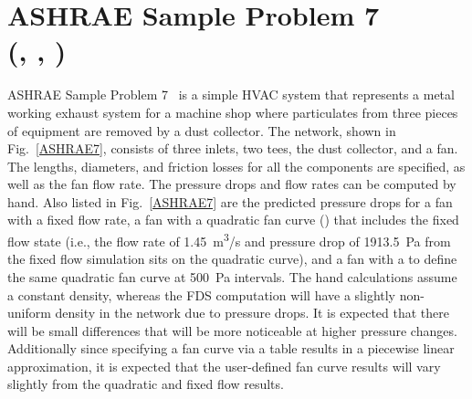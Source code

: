 \documentclass[11pt]{book}
\begin{document}
\FloatBarrier


\section{ASHRAE Sample Problem 7\\(\texorpdfstring{}{ashrae\_7\_fixed\_flow}, \texorpdfstring{}{ashrae\_7\_quadratic}, \texorpdfstring{}{ashrae\_7\_table})}
\label{ashrae7}
\label{ashrae7_fixed_flow}
\label{ashrae7_quadratic}
\label{ashrae7_table}

ASHRAE Sample Problem 7~\cite{ASHRAE} is a simple HVAC system that represents a metal working exhaust system for a machine shop where particulates from three pieces of equipment are removed by a dust collector.  The network, shown in Fig.~\ref{ASHRAE7}, consists of three inlets, two tees, the dust collector, and a fan.  The lengths, diameters, and friction losses for all the components are specified, as well as the fan flow rate. The pressure drops and flow rates can be computed by hand.  Also listed in Fig.~\ref{ASHRAE7} are the predicted pressure drops for a fan with a fixed flow rate, a fan with a quadratic fan curve () that includes the fixed flow state (i.e., the flow rate of 1.45~\si{m^3/s} and pressure drop of 1913.5~Pa from the fixed flow simulation sits on the quadratic curve), and a fan with a  to define the same quadratic fan curve at 500~Pa intervals. The hand calculations assume a constant density, whereas the FDS computation will have a slightly non-uniform density in the network due to pressure drops. It is expected that there will be small differences that will be more noticeable at higher pressure changes.  Additionally since specifying a fan curve via a table results in a piecewise linear approximation, it is expected that the user-defined fan curve results will vary slightly from the quadratic and fixed flow results.
\end{document}
